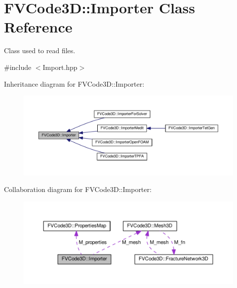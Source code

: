 \hypertarget{classFVCode3D_1_1Importer}{}\section{F\+V\+Code3D\+:\+:Importer Class Reference}
\label{classFVCode3D_1_1Importer}


Class used to read files.  




{\ttfamily \#include $<$Import.\+hpp$>$}



Inheritance diagram for F\+V\+Code3D\+:\+:Importer\+:
\nopagebreak
\begin{figure}[H]
\begin{center}
\leavevmode
\includegraphics[width=350pt]{classFVCode3D_1_1Importer__inherit__graph}
\end{center}
\end{figure}


Collaboration diagram for F\+V\+Code3D\+:\+:Importer\+:
\nopagebreak
\begin{figure}[H]
\begin{center}
\leavevmode
\includegraphics[width=350pt]{classFVCode3D_1_1Importer__coll__graph}
\end{center}
\end{figure}
